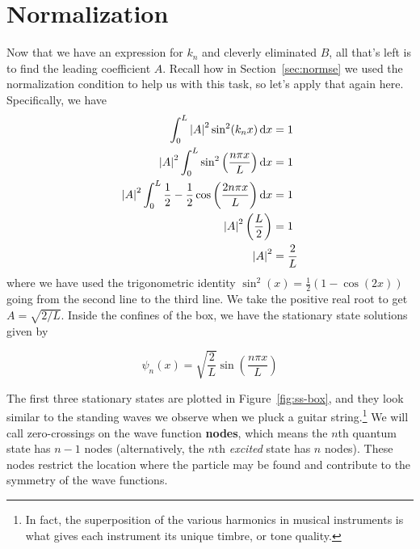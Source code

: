 
\section{Normalization}
Now that we have an expression for $k_n$ and cleverly eliminated $B$, all that's left is to find the leading coefficient $A$. Recall how in Section~\ref{sec:normse} we used the normalization condition to help us with this task, so let's apply that again here. Specifically, we have
\begin{align*}
	\int_0^L \abs{A}^2 \sin^2(k_nx)\dd{x} &= 1 \\
	\abs{A}^2 \int_0^L \sin^2\left(\frac{n\pi x}{L}\right)\dd{x} &= 1 \\ 
	\abs{A}^2 \int_0^L \frac{1}{2} - \frac{1}{2}\cos\left(\frac{2n\pi x}{L}\right)\dd{x} &= 1 \\
	\abs{A}^2 \left(\frac{L}{2}\right) &= 1 \\
	\abs{A}^2 &= \frac{2}{L}
\end{align*}
where we have used the trigonometric identity $\sin^2(x) = \frac{1}{2}\left(1 - \cos(2x)\right)$ going from the second line to the third line. We take the positive real root to get $A = \sqrt{2/L}$. Inside the confines of the box, we have the stationary state solutions given by 
\begin{tcolorbox}[title=Stationary state solutions] \vspace{-2ex}
	\begin{equation}
		\psi_n(x) = \sqrt{\frac{2}{L}} \sin \left(\frac{n\pi x}{L}\right) \label{eq:box-ss}
	\end{equation}
\end{tcolorbox}

The first three stationary states are plotted in Figure~\ref{fig:ss-box}, and they look similar to the standing waves we observe when we pluck a guitar string.\footnote{In fact, the superposition of the various harmonics in musical instruments is what gives each instrument its unique timbre, or tone quality.} We will call zero-crossings on the wave function \textbf{nodes}, which means the $n$th quantum state has $n-1$ nodes (alternatively, the $n$th \emph{excited} state has $n$ nodes). These nodes restrict the location where the particle may be found and contribute to the symmetry of the wave functions.

